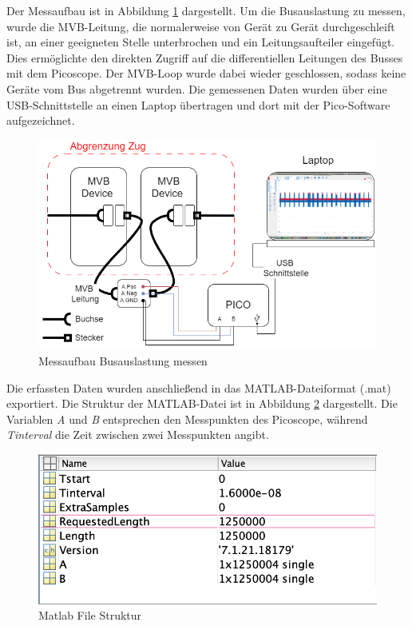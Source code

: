 Der Messaufbau ist in Abbildung \ref{fig:MessaufbauBusauslastungMessen} dargestellt. Um die Busauslastung zu messen, wurde die MVB-Leitung, die normalerweise von Gerät zu Gerät durchgeschleift ist, an einer geeigneten Stelle unterbrochen und ein Leitungsaufteiler eingefügt. Dies ermöglichte den direkten Zugriff auf die differentiellen Leitungen des Busses mit dem Picoscope. Der MVB-Loop wurde dabei wieder geschlossen, sodass keine Geräte vom Bus abgetrennt wurden. Die gemessenen Daten wurden über eine USB-Schnittstelle an einen Laptop übertragen und dort mit der Pico-Software aufgezeichnet.

\begin{figure}[H]
    \centering
    \includegraphics[width=0.8\linewidth]{Figures/Chap3/Busauslastung/Messaufbau_PICO_IC2000.png}
    \caption{Messaufbau Busauslastung messen}
    \label{fig:MessaufbauBusauslastungMessen}
\end{figure}

Die erfassten Daten wurden anschließend in das MATLAB-Dateiformat (.mat) exportiert. Die Struktur der MATLAB-Datei ist in Abbildung \ref{fig:MatlabFileStruktur} dargestellt. Die Variablen \textit{A} und \textit{B} entsprechen den Messpunkten des Picoscope, während \textit{Tinterval} die Zeit zwischen zwei Messpunkten angibt. 

\begin{figure}[H]
    \centering
    \includegraphics[width=0.5\linewidth]{Figures/Chap3/Busauslastung/Matlab_file_struktur.png}
    \caption{Matlab File Struktur}
    \label{fig:MatlabFileStruktur}
\end{figure}

